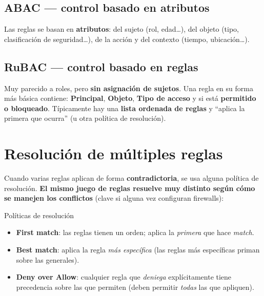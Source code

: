 \documentclass[11pt,a4paper]{article}
\begin{document}
\subsection{ABAC — control basado en atributos}
Las reglas se basan en \textbf{atributos}: del sujeto (rol, edad\dots), del objeto (tipo,
clasificación de seguridad\dots), de la acción y del contexto (tiempo, ubicación\dots).

\subsection{RuBAC — control basado en reglas}
Muy parecido a roles, pero \textbf{sin asignación de sujetos}. Una regla en su forma más
básica contiene: \textbf{Principal}, \textbf{Objeto}, \textbf{Tipo de acceso} y si está
\textbf{permitido o bloqueado}. Típicamente hay una \textbf{lista ordenada de reglas} y
``aplica la primera que ocurra'' (u otra política de resolución).

\section{Resolución de múltiples reglas}

Cuando varias reglas aplican de forma \textbf{contradictoria}, se usa alguna política de
resolución. \textbf{El mismo juego de reglas resuelve muy distinto según cómo se manejen los
conflictos} (clave si alguna vez configuran firewalls):

\begin{defbox}{Políticas de resolución}
\begin{itemize}[leftmargin=1.4em,itemsep=2pt]
  \item \textbf{First match}: las reglas tienen un orden; aplica la \emph{primera} que hace
        \emph{match}.
  \item \textbf{Best match}: aplica la regla \emph{más específica} (las reglas más específicas
        priman sobre las generales).
  \item \textbf{Deny over Allow}: cualquier regla que \emph{deniega} explícitamente tiene
        precedencia sobre las que permiten (deben permitir \emph{todas} las que apliquen).
\end{itemize}
\end{defbox}
\end{document}
